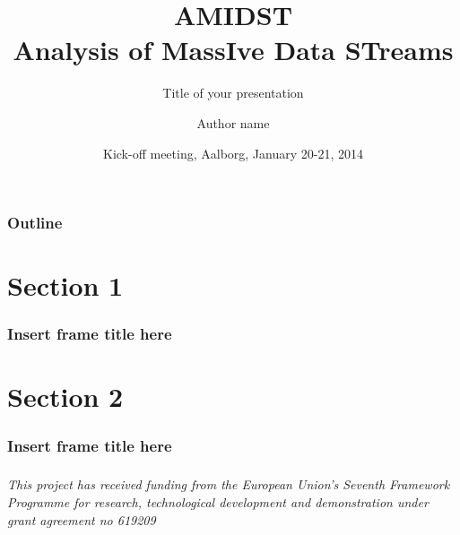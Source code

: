 \documentclass{beamer}
\title{AMIDST \\ \Large \textcolor{orange!60}{Analysis} 
				   \textcolor{blue!50!cyan!80}{of MassIve} 
				   \textcolor{olive!5!green!90}{Data STreams}}
\subtitle{Title of your presentation}
\author{Author name}
\institute{Affiliation}
\date{Kick-off meeting, Aalborg, January 20-21, 2014}
\begin{document}
\begin{frame}\frametitle{}
\titlepage
\end{frame}
\begin{frame}\frametitle{Outline}
\vspace{-1cm}
\tableofcontents
\end{frame}

\section{Section 1}

\begin{frame} \frametitle{Insert frame title here} 
\vspace{-1cm}

\end{frame}

\section{Section 2}

\begin{frame} \frametitle{Insert frame title here} 
\vspace{-1cm}

\end{frame}


\begin{frame} \frametitle{} 
{\it This project has received funding from the European Union's Seventh Framework Programme for research, technological development and demonstration under grant agreement no 619209}
\end{frame}
\end{document}
